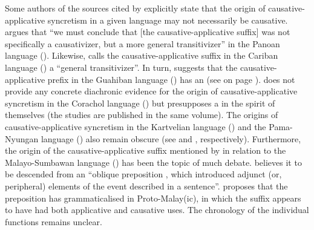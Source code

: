 Some authors of the sources cited by \citet{shibatani:pardeshi:2002} explicitly state that the origin of causative-applicative syncretism in a given language may not necessarily be causative. \citet[396]{fleck:2002} argues that “we must conclude that [the causative-applicative suffix]  was not specifically a causativizer, but a more general transitivizer” in the Panoan language  (). Likewise, \citet[344]{stefanowitsch:2002} calls the causative-applicative suffix  in the Cariban language  () a “general transitivizer”. In turn, \citet{queixalos:2002} suggests that the causative-applicative prefix  in the Guahiban language  () has an  (see  on page \pageref{tab:ch7:appl-caus-sikuani}). \citet[228]{vazquez-soto:2002} does not provide any concrete diachronic evidence for the origin of causative-applicative syncretism in the Corachol language  () but presupposes a  in the spirit of \citet{shibatani:pardeshi:2002} themselves (the studies are published in the same volume). The origins of causative-applicative syncretism in the Kartvelian language  () and the Pama-Nyungan language  () also remain obscure (see \citealt{kulikov:1993} and \citealt{austin:2005}, respectively). Furthermore, the origin of the causative-applicative suffix  mentioned by \citet{shibatani:pardeshi:2002} in relation to the Malayo-Sumbawan language  () has been the topic of much debate. \citet[438]{kikusawa:2012} believes it to be descended from an “oblique preposition , which introduced adjunct (or, peripheral) elements of the event described in a sentence”. \citet[439]{kikusawa:2012} proposes that the preposition has grammaticalised in Proto-Malay(ic), in which the suffix  appears to have had both applicative and causative uses. The chronology of the individual functions remains unclear.

